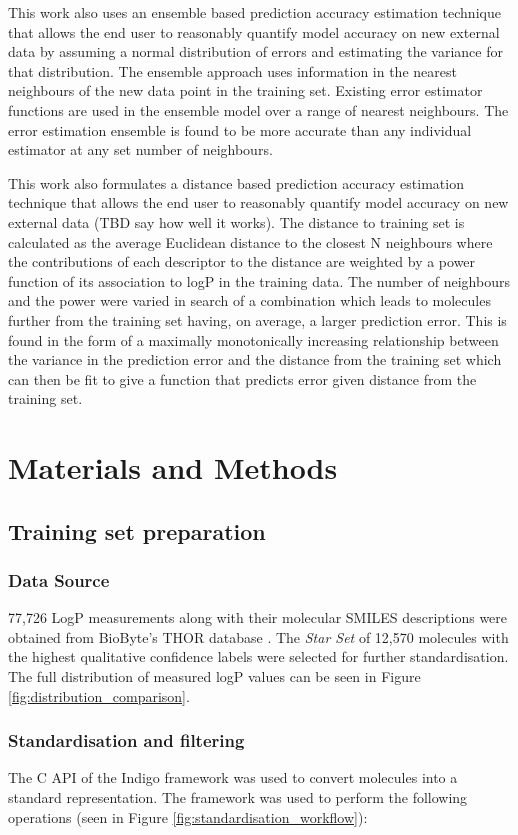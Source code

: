 \documentclass[10pt]{bmc_article}
\newenvironment{bmcformat}{\begin{raggedright}\baselineskip20pt\sloppy\setboolean{publ}{false}}{\end{raggedright}\baselineskip20pt\sloppy}
\begin{document}
\begin{bmcformat}
This work also uses an ensemble based prediction accuracy estimation technique that allows the end user to reasonably quantify model accuracy on new external data by assuming a normal distribution of errors and estimating the variance for that distribution. The ensemble approach uses information in the nearest neighbours of the new data point in the training set. Existing error estimator functions are used in the ensemble model over a range of nearest neighbours. The error estimation ensemble is found to be more accurate than any individual estimator at any set number of neighbours.

This work also formulates a distance based prediction accuracy estimation technique that allows the end user to reasonably quantify model accuracy on new external data (TBD say how well it works). The distance to training set is calculated as the average Euclidean distance to the closest N neighbours where the contributions of each descriptor to the distance are weighted by a power function of its association to logP in the training data. The number of neighbours and the power were varied in search of a combination which leads to molecules further from the training set having, on average, a larger prediction error. This is found in the form of a maximally monotonically increasing relationship between the variance in the prediction error and the distance from the training set which can then be fit to give a function that predicts error given distance from the training set.    
   
\section*{Materials and Methods}
\subsection*{Training set preparation}
\subsubsection*{Data Source}
77,726 LogP measurements along with their molecular SMILES descriptions were obtained from BioByte's THOR database \cite{leo_partition_1971}. The \textit{Star Set} of 12,570 molecules with the highest qualitative confidence labels were selected for further standardisation. The full distribution of measured logP values can be seen in Figure \ref{fig:distribution_comparison}.

\subsubsection*{Standardisation and filtering}
The C API of the Indigo framework \cite{_gga_????} was used to convert molecules into a standard representation. The framework was used to perform the following operations (seen in Figure \ref{fig:standardisation_workflow}): 


\end{bmcformat}
\end{document}
